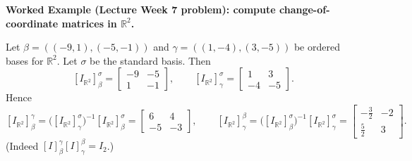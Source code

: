\begin{examplebox}
\textbf{Worked Example (Lecture Week 7 problem): compute change-of-coordinate matrices in $\mathbb{R}^2$.}

Let $\beta=(({-9},1),({-5},{-1}))$ and $\gamma=((1,{-4}),(3,{-5}))$ be ordered bases for $\mathbb{R}^2$.
Let $\sigma$ be the standard basis. Then
\[
[I_{\mathbb{R}^2}]^{\sigma}_{\beta}
=
\begin{bmatrix}
-9 & -5\\
1 & -1
\end{bmatrix},
\qquad
[I_{\mathbb{R}^2}]^{\sigma}_{\gamma}
=
\begin{bmatrix}
1 & 3\\
-4 & -5
\end{bmatrix}.
\]
Hence
\[
[I_{\mathbb{R}^2}]^{\gamma}_{\beta}
=\bigl([I_{\mathbb{R}^2}]^{\sigma}_{\gamma}\bigr)^{-1}[I_{\mathbb{R}^2}]^{\sigma}_{\beta}
=
\begin{bmatrix}
6 & 4\\
-5 & -3
\end{bmatrix},
\qquad
[I_{\mathbb{R}^2}]^{\beta}_{\gamma}
=\bigl([I_{\mathbb{R}^2}]^{\sigma}_{\beta}\bigr)^{-1}[I_{\mathbb{R}^2}]^{\sigma}_{\gamma}
=
\begin{bmatrix}
-\tfrac{3}{2} & -2\\
\tfrac{5}{2} & 3
\end{bmatrix}.
\]
(Indeed $[I]^{\gamma}_{\beta}[I]^{\beta}_{\gamma}=I_2$.)
\end{examplebox}

